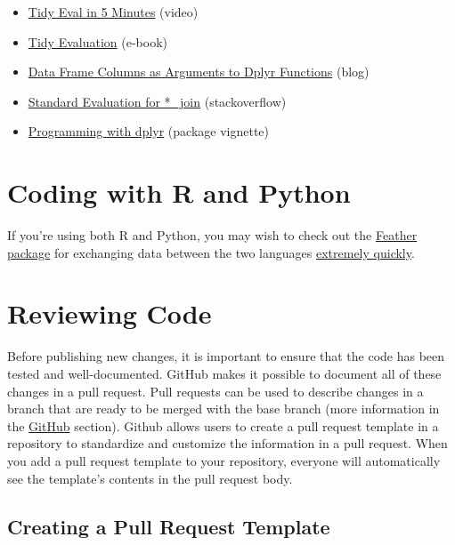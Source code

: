 \documentclass[]{book}
\providecommand{\tightlist}{%
  \setlength{\itemsep}{0pt}\setlength{\parskip}{0pt}}
\begin{document}
\begin{itemize}
\tightlist
\item
  \href{https://www.youtube.com/watch?v=nERXS3ssntw}{Tidy Eval in 5
  Minutes} (video)
\item
  \href{https://tidyeval.tidyverse.org/index.html}{Tidy Evaluation}
  (e-book)
\item
  \href{https://www.brodrigues.co/blog/2016-07-18-data-frame-columns-as-arguments-to-dplyr-functions/}{Data
  Frame Columns as Arguments to Dplyr Functions} (blog)
\item
  \href{https://stackoverflow.com/questions/28125816/r-standard-evaluation-for-join-dplyr}{Standard
  Evaluation for *\_join} (stackoverflow)
\item
  \href{https://dplyr.tidyverse.org/articles/programming.html}{Programming
  with dplyr} (package vignette)
\end{itemize}

\section{Coding with R and Python}\label{coding-with-r-and-python}

If you're using both R and Python, you may wish to check out the
\href{https://www.rdocumentation.org/packages/feather/versions/0.3.3}{Feather
package} for exchanging data between the two languages
\href{https://blog.rstudio.com/2016/03/29/feather/}{extremely quickly}.

\section{Reviewing Code}\label{reviewing-code}

Before publishing new changes, it is important to ensure that the code
has been tested and well-documented. GitHub makes it possible to
document all of these changes in a pull request. Pull requests can be
used to describe changes in a branch that are ready to be merged with
the base branch (more information in the
\protect\hyperlink{Github}{GitHub} section). Github allows users to
create a pull request template in a repository to standardize and
customize the information in a pull request. When you add a pull request
template to your repository, everyone will automatically see the
template's contents in the pull request body.

\subsection{Creating a Pull Request
Template}\label{creating-a-pull-request-template}
\end{document}
